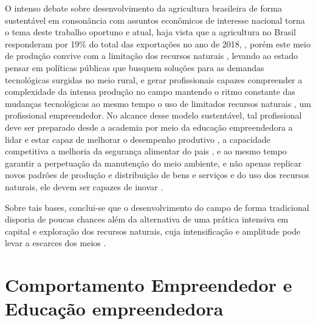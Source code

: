 O intenso debate sobre desenvolvimento da agricultura brasileira de forma sustentável em consonância com assuntos econômicos de interesse nacional torna o tema deste trabalho oportuno e atual, haja vista que a agricultura no Brasil responderam por 19\% do total das exportações no ano de 2018, \cite{mdic_comex_2019}, porém este meio de produção convive com a  limitação dos recursos naturais \cite{jacobi_meio_1999}, levando ao estado pensar em políticas públicas que busquem soluções para as demandas tecnológicas surgidas no meio rural, e gerar profissionais capazes compreender a complexidade da intensa produção no campo mantendo o ritmo constante das mudanças tecnológicas ao mesmo tempo o uso de limitados recursos naturais  \cite{costa_dinamica_2016}, um profissional empreendedor.
No alcance desse modelo sustentável, tal profissional deve ser preparado desde a academia por meio da educação empreendedora a lidar e estar capaz de melhorar o desempenho produtivo \cite{da_silva_qualidade_2017}, a capacidade competitiva a melhoria da segurança alimentar do pais \cite{hoffmann_brasil_2014}, e ao mesmo tempo garantir a perpetuação da manutenção do meio ambiente, e não apenas replicar novos padrões de produção e distribuição de bens e serviços e do uso dos recursos naturais, ele devem ser capazes de inovar \cite{morais_empreendedorismo_2018}.

Sobre tais bases, conclui-se que o desenvolvimento do campo de forma tradicional disporia de poucas chances além da alternativa de uma prática intensiva em capital e exploração dos recursos naturais, cuja intensificação e amplitude pode levar a escarces dos meios \cite{costa_agrarian_2016}. 



\section{Comportamento Empreendedor e Educação empreendedora}



